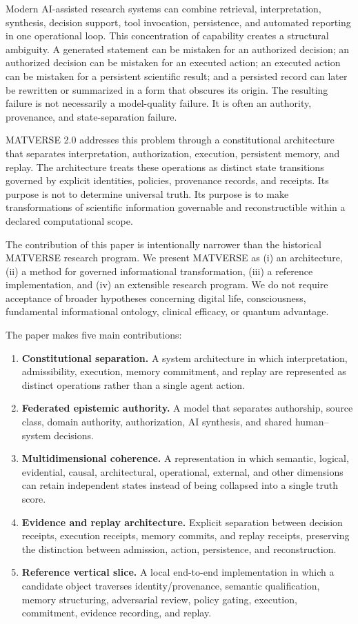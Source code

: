 \documentclass[11pt]{article}
\begin{document}
Modern AI-assisted research systems can combine retrieval, interpretation, synthesis, decision support, tool invocation, persistence, and automated reporting in one operational loop. This concentration of capability creates a structural ambiguity. A generated statement can be mistaken for an authorized decision; an authorized decision can be mistaken for an executed action; an executed action can be mistaken for a persistent scientific result; and a persisted record can later be rewritten or summarized in a form that obscures its origin. The resulting failure is not necessarily a model-quality failure. It is often an authority, provenance, and state-separation failure.

MATVERSE 2.0 addresses this problem through a constitutional architecture that separates interpretation, authorization, execution, persistent memory, and replay. The architecture treats these operations as distinct state transitions governed by explicit identities, policies, provenance records, and receipts. Its purpose is not to determine universal truth. Its purpose is to make transformations of scientific information governable and reconstructible within a declared computational scope.

The contribution of this paper is intentionally narrower than the historical MATVERSE research program. We present MATVERSE as (i) an architecture, (ii) a method for governed informational transformation, (iii) a reference implementation, and (iv) an extensible research program. We do not require acceptance of broader hypotheses concerning digital life, consciousness, fundamental informational ontology, clinical efficacy, or quantum advantage.

The paper makes five main contributions:

\begin{enumerate}
  \item \textbf{Constitutional separation.} A system architecture in which interpretation, admissibility, execution, memory commitment, and replay are represented as distinct operations rather than a single agent action.
  \item \textbf{Federated epistemic authority.} A model that separates authorship, source class, domain authority, authorization, AI synthesis, and shared human--system decisions.
  \item \textbf{Multidimensional coherence.} A representation in which semantic, logical, evidential, causal, architectural, operational, external, and other dimensions can retain independent states instead of being collapsed into a single truth score.
  \item \textbf{Evidence and replay architecture.} Explicit separation between decision receipts, execution receipts, memory commits, and replay receipts, preserving the distinction between admission, action, persistence, and reconstruction.
  \item \textbf{Reference vertical slice.} A local end-to-end implementation in which a candidate object traverses identity/provenance, semantic qualification, memory structuring, adversarial review, policy gating, execution, commitment, evidence recording, and replay.
\end{enumerate}
\end{document}
